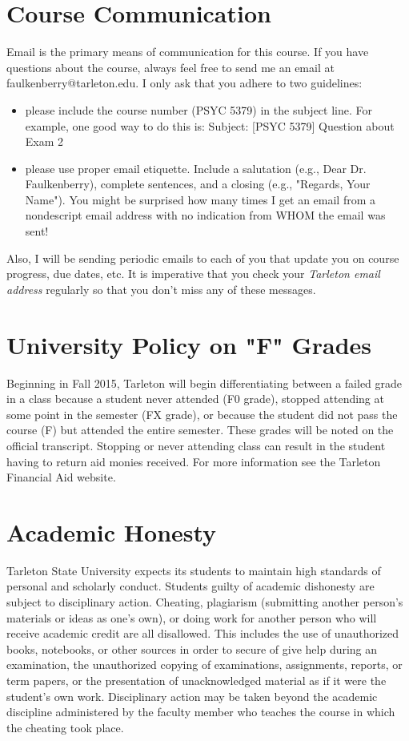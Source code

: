 \documentclass[10pt]{article}
\begin{document}
\section*{Course Communication}
\label{sec-7}

Email is the primary means of communication for this course.  If you have questions about the course, always feel free to send me an email at faulkenberry@tarleton.edu.  I only ask that you adhere to two guidelines:
\begin{itemize}
\item please include the course number (PSYC 5379) in the subject line.  For example, one good way to do this is:  Subject: [PSYC 5379] Question about Exam 2
\item please use proper email etiquette.  Include a salutation (e.g., Dear Dr. Faulkenberry), complete sentences, and a closing (e.g., "Regards, Your Name").  You might be surprised how many times I get an email from a nondescript email address with no indication from WHOM the email was sent!
\end{itemize}

Also, I will be sending periodic emails to each of you that update you on course progress, due dates, etc.  It is imperative that you check your \emph{Tarleton email address} regularly so that you don't miss any of these messages.

\section*{University Policy on "F" Grades}
\label{sec-8}
Beginning in Fall 2015, Tarleton will begin differentiating between a 
failed grade in a class because a student never attended (F0 grade), 
stopped attending at some point in the semester (FX grade), or because 
the student did not pass the course (F) but attended the entire semester. 
These grades will be noted on the official transcript. Stopping or never 
attending class can result in the student having to return aid monies 
received.  For more information see the Tarleton Financial Aid website.

\section*{Academic Honesty}
\label{sec-9}

Tarleton State University expects its students to maintain high standards of
personal and scholarly conduct. Students guilty of academic dishonesty are
subject to disciplinary action. Cheating, plagiarism (submitting another person’s materials or ideas as one’s own), or doing work for another person who will receive academic credit are all disallowed. This includes the use of unauthorized books, notebooks, or other sources in order to secure of give help during an examination, the unauthorized copying of examinations, assignments, reports, or term papers, or the presentation of unacknowledged material as if it were the student’s own work. Disciplinary action may be taken beyond the academic discipline administered by the faculty member who teaches the course in which the cheating took place.  
\end{document}
